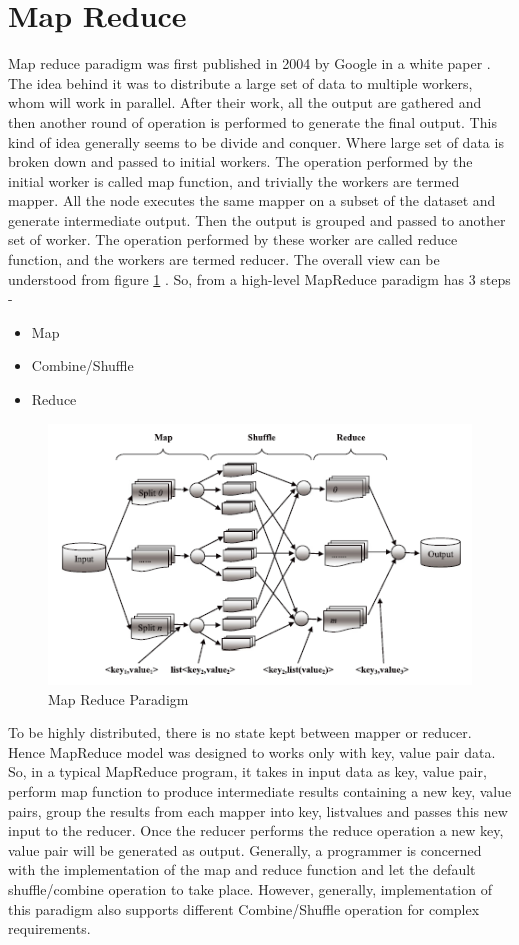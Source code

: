 \documentclass{article}
\begin{document}
\section{Map Reduce}
Map reduce paradigm was first published in 2004 by Google in a white paper \cite{mrgoogle}. The idea behind it was to distribute a large set of data to multiple workers, whom will work in parallel. After their work, all the output are gathered and then another round of operation is performed to generate the final output. This kind of idea generally seems to be divide and conquer. Where large set of data is broken down and passed to initial workers. The operation performed by the initial worker is called map function, and trivially the workers are termed mapper. All the node executes the same mapper on a subset of the dataset and generate intermediate output. Then the output is grouped and passed to another set of worker. The operation performed by these worker are called reduce function, and the workers are termed reducer. The overall view can be understood from figure \ref{fig:mrp} \cite{c452017}. So, from a high-level MapReduce paradigm has 3 steps -
\begin{itemize}
\item Map
\item Combine/Shuffle
\item Reduce
\end{itemize}
\begin{figure}[h]
	\centering
	\includegraphics[width=\textwidth]{mr-hadoop-overview}
	\caption{Map Reduce Paradigm}
	\label{fig:mrp}
\end{figure}
To be highly distributed, there is no state kept between mapper or reducer. Hence MapReduce model was designed to works only with {key, value} pair data. So, in a typical MapReduce program, it takes in input data as {key, value} pair, perform map function to produce intermediate results containing a new {key, value} pairs, group the results from each mapper into {key, list{values}} and passes this new input to the reducer. Once the reducer performs the reduce operation a new {key, value} pair will be generated as output. Generally, a programmer is concerned with the implementation of the map and reduce function and let the default shuffle/combine operation to take place. However, generally, implementation of this paradigm also supports different Combine/Shuffle operation for complex requirements.
\end{document}
